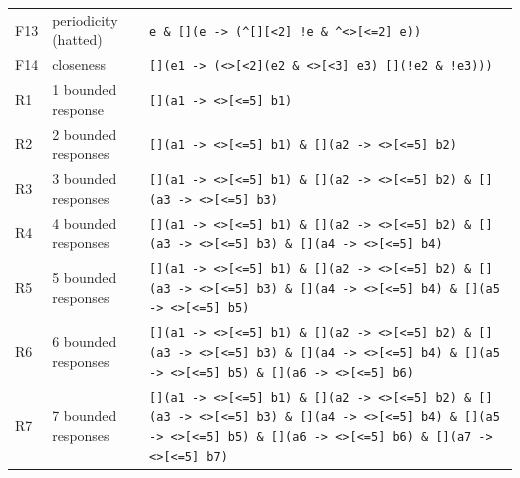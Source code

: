 \begin{table}[t]
\begin{tabular}{@{}llp{}@{}}
F13 & periodicity (hatted) & \texttt{e \& [](e -\textgreater{} (\^{}[][\textless{}2] !e \& \^{}\textless{}\textgreater{}[\textless{}=2] e))}\\
F14 & closeness & \texttt{[](e1 -\textgreater{} (\textless{}\textgreater{}[\textless{}2](e2 \& \textless{}\textgreater{}[\textless{}3] e3) \textbar{} [](!e2 \& !e3)))}\\
R1 & 1 bounded response & \texttt{[](a1 -\textgreater{} \textless{}\textgreater{}[\textless{}=5] b1)}\\
R2 & 2 bounded responses & \texttt{[](a1 -\textgreater{} \textless{}\textgreater{}[\textless{}=5] b1) \& [](a2 -\textgreater{} \textless{}\textgreater{}[\textless{}=5] b2)}\\
R3 & 3 bounded responses & \texttt{[](a1 -\textgreater{} \textless{}\textgreater{}[\textless{}=5] b1) \& [](a2 -\textgreater{} \textless{}\textgreater{}[\textless{}=5] b2) \& [](a3 -\textgreater{} \textless{}\textgreater{}[\textless{}=5] b3)}\\
R4 & 4 bounded responses & \texttt{[](a1 -\textgreater{} \textless{}\textgreater{}[\textless{}=5] b1) \& [](a2 -\textgreater{} \textless{}\textgreater{}[\textless{}=5] b2) \& [](a3 -\textgreater{} \textless{}\textgreater{}[\textless{}=5] b3) \& [](a4 -\textgreater{} \textless{}\textgreater{}[\textless{}=5] b4)}\\
R5 & 5 bounded responses & \texttt{[](a1 -\textgreater{} \textless{}\textgreater{}[\textless{}=5] b1) \& [](a2 -\textgreater{} \textless{}\textgreater{}[\textless{}=5] b2) \& [](a3 -\textgreater{} \textless{}\textgreater{}[\textless{}=5] b3) \& [](a4 -\textgreater{} \textless{}\textgreater{}[\textless{}=5] b4) \& [](a5 -\textgreater{} \textless{}\textgreater{}[\textless{}=5] b5)}\\
R6 & 6 bounded responses & \texttt{[](a1 -\textgreater{} \textless{}\textgreater{}[\textless{}=5] b1) \& [](a2 -\textgreater{} \textless{}\textgreater{}[\textless{}=5] b2) \& [](a3 -\textgreater{} \textless{}\textgreater{}[\textless{}=5] b3) \& [](a4 -\textgreater{} \textless{}\textgreater{}[\textless{}=5] b4) \& [](a5 -\textgreater{} \textless{}\textgreater{}[\textless{}=5] b5) \& [](a6 -\textgreater{} \textless{}\textgreater{}[\textless{}=5] b6)}\\
R7 & 7 bounded responses & \texttt{[](a1 -\textgreater{} \textless{}\textgreater{}[\textless{}=5] b1) \& [](a2 -\textgreater{} \textless{}\textgreater{}[\textless{}=5] b2) \& [](a3 -\textgreater{} \textless{}\textgreater{}[\textless{}=5] b3) \& [](a4 -\textgreater{} \textless{}\textgreater{}[\textless{}=5] b4) \& [](a5 -\textgreater{} \textless{}\textgreater{}[\textless{}=5] b5) \& [](a6 -\textgreater{} \textless{}\textgreater{}[\textless{}=5] b6) \& [](a7 -\textgreater{} \textless{}\textgreater{}[\textless{}=5] b7)}\\

\end{tabular}
\end{table}
